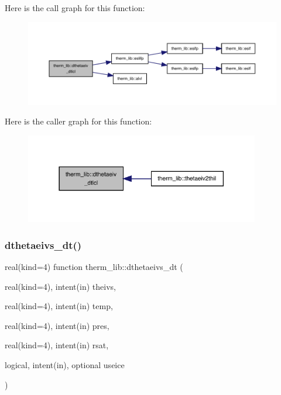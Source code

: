 Here is the call graph for this function\+:
\nopagebreak
\begin{figure}[H]
\begin{center}
\leavevmode
\includegraphics[width=350pt]{namespacetherm__lib_a46f478124e2b8b34a4f64e13df4a9713_cgraph}
\end{center}
\end{figure}
Here is the caller graph for this function\+:
\nopagebreak
\begin{figure}[H]
\begin{center}
\leavevmode
\includegraphics[width=290pt]{namespacetherm__lib_a46f478124e2b8b34a4f64e13df4a9713_icgraph}
\end{center}
\end{figure}
\mbox{\label{namespacetherm__lib_a2c2d9dff6ab1ea0e1385b7f94e322c26}} 
\subsubsection{\texorpdfstring{dthetaeivs\+\_\+dt()}{dthetaeivs\_dt()}}
{\footnotesize\ttfamily real(kind=4) function therm\+\_\+lib\+::dthetaeivs\+\_\+dt (\begin{DoxyParamCaption}\item[{real(kind=4), intent(in)}]{theivs,  }\item[{real(kind=4), intent(in)}]{temp,  }\item[{real(kind=4), intent(in)}]{pres,  }\item[{real(kind=4), intent(in)}]{rsat,  }\item[{logical, intent(in), optional}]{useice }\end{DoxyParamCaption})}

